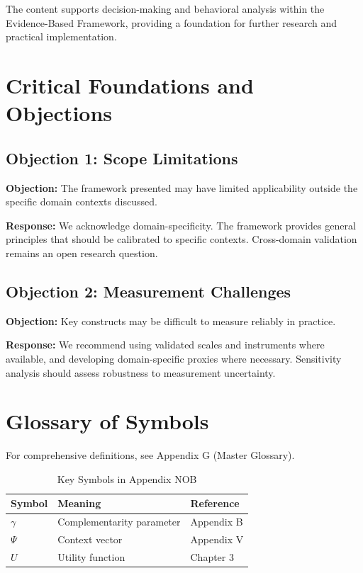 The content supports decision-making and behavioral analysis within the
Evidence-Based Framework, providing a foundation for further research
and practical implementation.



\section{Critical Foundations and Objections}
\label{sec:nob-foundations}

\subsection{Objection 1: Scope Limitations}

\textbf{Objection:} The framework presented may have limited applicability
outside the specific domain contexts discussed.

\textbf{Response:} We acknowledge domain-specificity. The framework provides
general principles that should be calibrated to specific contexts. Cross-domain
validation remains an open research question.

\subsection{Objection 2: Measurement Challenges}

\textbf{Objection:} Key constructs may be difficult to measure reliably in
practice.

\textbf{Response:} We recommend using validated scales and instruments where
available, and developing domain-specific proxies where necessary. Sensitivity
analysis should assess robustness to measurement uncertainty.



\section{Glossary of Symbols}
\label{sec:nob-glossary}

For comprehensive definitions, see Appendix G (Master Glossary).

\begin{table}[htbp]
\centering
\caption{Key Symbols in Appendix NOB}
\begin{tabular}{lll}
\toprule
\textbf{Symbol} & \textbf{Meaning} & \textbf{Reference} \\
\midrule
$\gamma$ & Complementarity parameter & Appendix B \\
$\Psi$ & Context vector & Appendix V \\
$U$ & Utility function & Chapter 3 \\
\bottomrule
\end{tabular}
\end{table}


